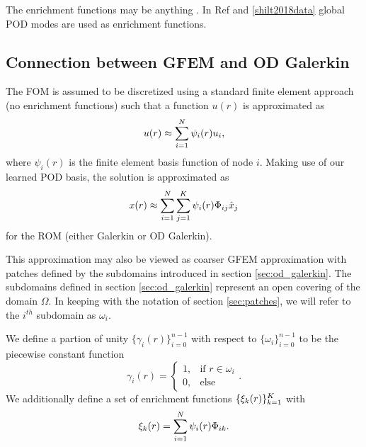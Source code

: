 The enrichment functions may be anything .
In Ref \cite{aquino2009generalized} and \ref{shilt2018data} global POD modes are used as enrichment functions.

\subsection{Connection between GFEM and OD Galerkin}

The FOM is assumed to be discretized using a standard finite element approach (no enrichment functions) such that a function $u(r)$ is approximated as 
\begin{equation}
\label{eq:fem}
u(r) \approx \sum_{i=1}^N \psi_i(r) u_i,
\end{equation}
where $\psi_i(r)$ is the finite element basis function of node $i$.
Making use of our learned POD basis, the solution is approximated as
\begin{equation}
x(r) \approx \sum_{i=1}^N \sum_{j=1}^K \psi_i(r) \Phi_{ij}\hat{x}_j
\end{equation}
for the ROM (either Galerkin or OD Galerkin).

This approximation may also be viewed as coarser GFEM approximation with patches defined by the subdomains introduced in section \ref{sec:od_galerkin}.
The subdomains defined in section \ref{sec:od_galerkin} represent an open covering of the domain $\Omega$.
In keeping with the notation of section \ref{sec:patches}, we will refer to the $i^{th}$ subdomain as $\omega_i$.

We define a partion of unity $\lbrace\gamma_i(r)\rbrace_{i=0}^{n-1}$ with respect to $\lbrace\omega_i\rbrace_{i=0}^{n-1}$
to be the piecewise constant function
\begin{equation}
\gamma_i(r) = 
\begin{cases}
1,& \text{if } r\in\omega_i \\
0,& \text{else}
\end{cases}. 
\end{equation}
We additionally define a set of enrichment functions $\lbrace\xi_k(r)\rbrace_{k=1}^K$ with
\begin{equation}
\xi_k(r) = \sum_{i=1}^N \psi_i(r) \Phi_{ik}.
\end{equation}

